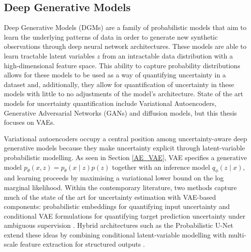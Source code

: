 \subsection{Deep Generative Models}

Deep Generative Models (DGMs) are a family of probabilistic models that aim to learn the underlying patterns of data in order to generate new synthetic observations through deep neural network architectures. These models are able to learn tractable latent variables \(z\) from an intractable data distribution with a high-dimensional feature space. This ability to capture probability distributions allows for these models to be used as a way of quantifying uncertainty in a dataset and, additionally, they allow for quantification of uncertainty in these models with little to no adjustments of the model's architecture. State of the art models for uncertainty quantification include Variational Autoencoders, Generative Adversarial Networks (GANs) and diffusion models, but this thesis focuses on VAEs.

Variational autoencoders occupy a central position among uncertainty-aware deep generative models because they make uncertainty explicit through latent-variable probabilistic modelling. As seen in Section \ref{AE_VAE}, VAE specifies a generative model $p_\theta(x,z)=p_\theta(x\mid z)p(z)$ together with an inference model $q_\phi(z\mid x)$, and learning proceeds by maximising a variational lower bound on the log marginal likelihood. Within the contemporary literature, two methods capture much of the state of the art for uncertainty estimation with VAE-based components: probabilistic embeddings for quantifying input uncertainty and conditional VAE formulations for quantifying target prediction uncertainty under ambiguous supervision \cite{Chang2020,Sohn2015}. Hybrid architectures such as the Probabilistic U-Net extend these ideas by combining conditional latent-variable modelling with multi-scale feature extraction for structured outputs \cite{Kohl2018}.

